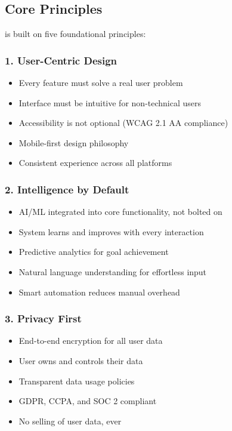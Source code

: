 \subsection{Core Principles}

\lifeos{} is built on five foundational principles:

\subsubsection{1. User-Centric Design}

\begin{itemize}
    \item Every feature must solve a real user problem
    \item Interface must be intuitive for non-technical users
    \item Accessibility is not optional (WCAG 2.1 AA compliance)
    \item Mobile-first design philosophy
    \item Consistent experience across all platforms
\end{itemize}

\subsubsection{2. Intelligence by Default}

\begin{itemize}
    \item AI/ML integrated into core functionality, not bolted on
    \item System learns and improves with every interaction
    \item Predictive analytics for goal achievement
    \item Natural language understanding for effortless input
    \item Smart automation reduces manual overhead
\end{itemize}

\subsubsection{3. Privacy First}

\begin{itemize}
    \item End-to-end encryption for all user data
    \item User owns and controls their data
    \item Transparent data usage policies
    \item GDPR, CCPA, and SOC 2 compliant
    \item No selling of user data, ever
\end{itemize}

